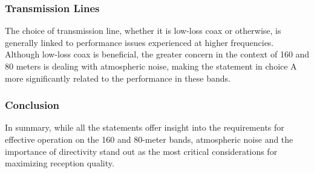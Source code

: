 \subsubsection{Transmission Lines}
The choice of transmission line, whether it is low-loss coax or otherwise, is generally linked to performance issues experienced at higher frequencies. Although low-loss coax is beneficial, the greater concern in the context of 160 and 80 meters is dealing with atmospheric noise, making the statement in choice A more significantly related to the performance in these bands.

\subsubsection{Conclusion}
In summary, while all the statements offer insight into the requirements for effective operation on the 160 and 80-meter bands, atmospheric noise and the importance of directivity stand out as the most critical considerations for maximizing reception quality.

